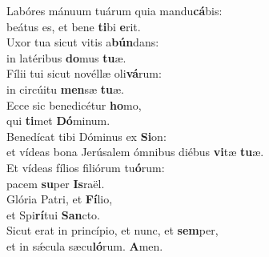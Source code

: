 \evenverse Labóres mánuum tuárum quia mandu\textbf{cá}bis:~\*\\
\evenverse beátus es, et bene \textbf{ti}bi \textbf{e}rit.\\
\oddverse Uxor tua sicut vitis a\textbf{bún}dans:~\*\\
\oddverse in latéribus \textbf{do}mus \textbf{tu}æ.\\
\evenverse Fílii tui sicut novéllæ oli\textbf{vá}rum:~\*\\
\evenverse in circúitu \textbf{men}sæ \textbf{tu}æ.\\
\oddverse Ecce sic benedicétur \textbf{ho}mo,~\*\\
\oddverse qui \textbf{ti}met \textbf{Dó}minum.\\
\evenverse Benedícat tibi Dóminus ex \textbf{Si}on:~\*\\
\evenverse et vídeas bona Jerúsalem ómnibus diébus \textbf{vi}tæ \textbf{tu}æ.\\
\oddverse Et vídeas fílios filiórum tu\textbf{ó}rum:~\*\\
\oddverse pacem \textbf{su}per \textbf{Is}raël.\\
\evenverse Glória Patri, et \textbf{Fí}lio,~\*\\
\evenverse et Spi\textbf{rí}tui \textbf{San}cto.\\
\oddverse Sicut erat in princípio, et nunc, et \textbf{sem}per,~\*\\
\oddverse et in sǽcula sæcu\textbf{ló}rum. \textbf{A}men.\\
